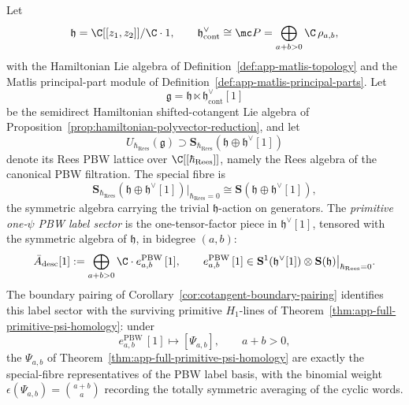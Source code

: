 \begin{constr}
\label{constr:app-full-pbw-special-fibre-basis}
  Let
  \[
    \mathfrak h=\C[[z_1,z_2]]/\C\cdot1,\qquad
    \mathfrak h^\vee_{\mathrm{cont}}\cong \mc P
      =\bigoplus_{a+b>0}\C\,\rho_{a,b},
  \]
  with the Hamiltonian Lie algebra of
  Definition~\ref{def:app-matlis-topology} and the Matlis principal-part
  module of Definition~\ref{def:app-matlis-principal-parts}.  Let
  \[
    \mathfrak g
      =\mathfrak h\ltimes\mathfrak h^\vee_{\mathrm{cont}}[1]
  \]
  be the semidirect Hamiltonian shifted-cotangent Lie algebra of
  Proposition~\ref{prop:hamiltonian-polyvector-reduction}, and let
  \[
    U_{\hbar_{\mathrm{Rees}}}(\mathfrak g)
      \supset
    \mathbf S_{\hbar_{\mathrm{Rees}}}(\mathfrak h\oplus\mathfrak h^\vee[1])
  \]
  denote its Rees PBW lattice over \(\C[[\hbar_{\mathrm{Rees}}]]\), namely the Rees
  algebra of the canonical PBW filtration.  The special fibre is
  \[
    \mathbf S_{\hbar_{\mathrm{Rees}}}(\mathfrak h\oplus\mathfrak h^\vee[1])
      \big|_{\hbar_{\mathrm{Rees}}=0}
      \cong
    \mathbf S(\mathfrak h\oplus\mathfrak h^\vee[1]),
  \]
  the symmetric algebra carrying the trivial \(\mathfrak h\)-action on
  generators.  The \emph{primitive one-\(\psi\) PBW label sector} is the
  one-tensor-factor piece in \(\mathfrak h^\vee[1]\), tensored with the
  symmetric algebra of \(\mathfrak h\), in bidegree \((a,b)\):
  \[
    \bar A_{\mathrm{desc}}[1]
      :=
    \bigoplus_{a+b>0}\C\cdot e^{\mathrm{PBW}}_{a,b}\,[1],
    \qquad
    e^{\mathrm{PBW}}_{a,b}\,[1]\in
    \mathbf S^1(\mathfrak h^\vee[1])\otimes
    \mathbf S(\mathfrak h)\big|_{\hbar_{\mathrm{Rees}}=0} .
  \]
  The boundary pairing of
  Corollary~\ref{cor:cotangent-boundary-pairing} identifies this label
  sector with the surviving primitive
  \(H_1\)-lines of
  Theorem~\ref{thm:app-full-primitive-psi-homology}: under
  \[
    e^{\mathrm{PBW}}_{a,b}\,[1]
      \longmapsto
    [\Psi_{a,b}],
    \qquad a+b>0,
  \]
  the \(\Psi_{a,b}\) of Theorem~\ref{thm:app-full-primitive-psi-homology}
  are exactly the special-fibre representatives of the PBW label basis,
  with the binomial weight \(\epsilon(\Psi_{a,b})=\binom{a+b}{a}\)
  recording the totally symmetric averaging of the cyclic words.
\end{constr}

